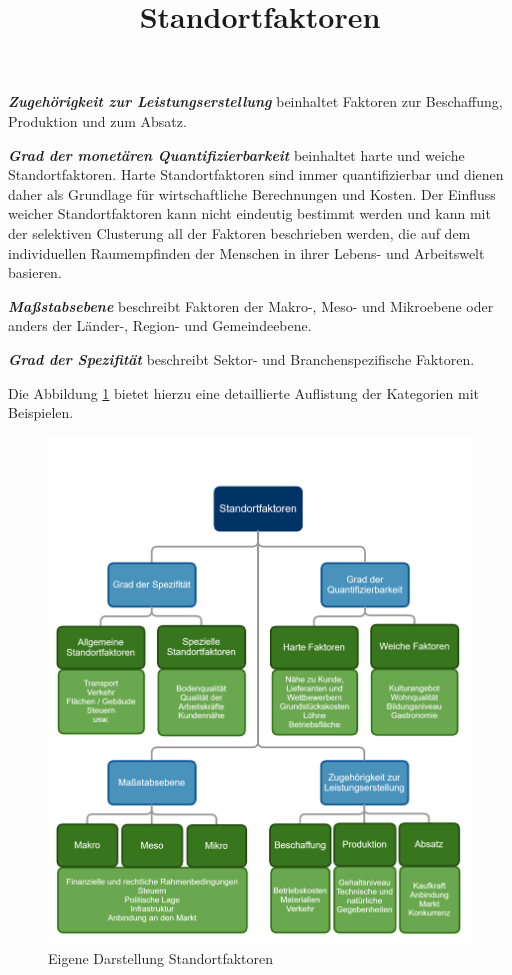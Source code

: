 \textbf{\emph{Zugehörigkeit zur Leistungserstellung}} beinhaltet Faktoren zur Beschaffung, Produktion und zum Absatz.

\textbf{\emph{Grad der monetären Quantifizierbarkeit}} beinhaltet harte und weiche Standortfaktoren. 
Harte Standortfaktoren sind immer quantifizierbar und dienen daher als Grundlage für wirtschaftliche Berechnungen und Kosten.
Der Einfluss weicher Standortfaktoren kann nicht eindeutig bestimmt werden und kann mit der selektiven Clusterung all der Faktoren beschrieben werden, die auf dem individuellen Raumempfinden der Menschen in ihrer Lebens- und Arbeitswelt basieren.

\textbf{\emph{Maßstabsebene}} beschreibt Faktoren der Makro-, Meso- und Mikroebene oder anders der Länder-, Region- und Gemeindeebene.

\textbf{\emph{Grad der Spezifität}} beschreibt Sektor- und Branchenspezifische Faktoren.

Die Abbildung \ref{img:standortfaktoren} bietet hierzu eine detaillierte Auflistung der Kategorien mit Beispielen.

\begin{figure}[H]
	\centering
	\includegraphics[scale=0.2]{resources/images/Standortfaktoren.png}
	\caption{Eigene Darstellung Standortfaktoren}
	\title{Standortfaktoren}
	\label{img:standortfaktoren}
\end{figure}

